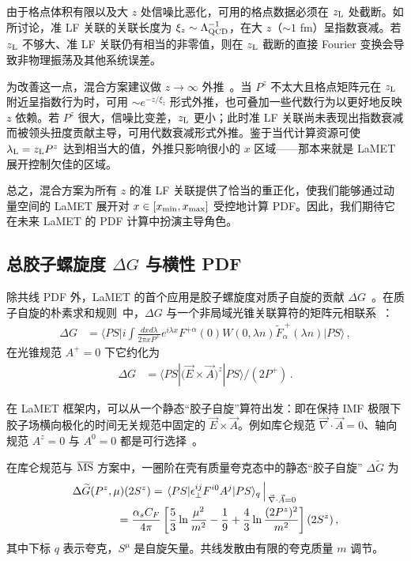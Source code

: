 由于格点体积有限以及大 $z$ 处信噪比恶化，可用的格点数据必须在 $z_{\rm L}$ 处截断。如  所讨论，准 LF 关联的关联长度为 $\xi_z\sim \Lambda_{\rm QCD}^{-1}$，在大 $z$（$\sim 1$ fm）呈指数衰减。若 $z_{\rm L}$ 不够大、准 LF 关联仍有相当的非零值，则在 $z_{\rm L}$ 截断的直接 Fourier 变换会导致非物理振荡及其他系统误差。

为改善这一点，混合方案建议做 $z\to\infty$ 外推~\cite{Ji:2020brr}。当 $P^z$ 不太大且格点矩阵元在 $z_{\rm L}$ 附近呈指数行为时，可用 $\sim e^{-z/\xi_z}$ 形式外推，也可叠加一些代数行为以更好地反映 $z$ 依赖。若 $P^z$ 很大，信噪比变差，$z_{\rm L}$ 更小；此时准 LF 关联尚未表现出指数衰减而被领头扭度贡献主导，可用代数衰减形式外推。鉴于当代计算资源可使 $\lambda_{\rm L} =z_{\rm L}P^z$ 达到相当大的值，外推只影响很小的 $x$ 区域——那本来就是 LaMET 展开控制欠佳的区域。

总之，混合方案为所有 $z$ 的准 LF 关联提供了恰当的重正化，使我们能够通过动量空间的 LaMET 展开对 $x\in[x_{\rm min}, x_{\rm max}]$ 受控地计算 PDF。因此，我们期待它在未来 LaMET 的 PDF 计算中扮演主导角色。

\subsection{总胶子螺旋度 $\Delta G$ 与横性 PDF}
\label{sec:deltaG}

除共线 PDF 外，LaMET 的首个应用是胶子螺旋度对质子自旋的贡献 $\Delta G$~\cite{Ji:2013fga}。在质子自旋的朴素求和规则~\cite{Jaffe:1989jz}中，$\Delta G$ 与一个非局域光锥关联算符的矩阵元相联系~\cite{Manohar:1990jx}：
\begin{align}\label{eq:sginv}
	\Delta G &\!=\! \langle PS\big|i\!\int\! \frac{dxd\lambda}{2\pi xP^+} e^{i\lambda x} \! F^{+\alpha}(0) W(0,\!\lambda n)\tilde F_{\alpha}^{~+} (\lambda n)\big|PS\rangle\,,
\end{align}
在光锥规范 $A^+=0$ 下它约化为
\begin{align}
	\Delta G &= \langle PS| \big(\vec{E}\times \vec{A}\big)^z|PS\rangle /(2P^+)\,.
\end{align}

在 LaMET 框架内，可以从一个静态``胶子自旋''算符出发：即在保持 IMF 极限下胶子场横向极化的时间无关规范中固定的 $\vec{E}\times \vec{A}$。例如库仑规范 $\vec{\nabla}\cdot \vec{A}=0$、轴向规范 $A^z=0$ 与 $A^0=0$ 都是可行选择~\cite{Hatta:2013gta}。

在库仑规范与 ${\overline{\rm MS}}$ 方案中，一圈阶在壳有质量夸克态中的静态``胶子自旋'' $\Delta \widetilde G$ 为~\cite{Chen:2011gn,Ji:2013fga}
\begin{align}  \label{eq:coulomb}
	&\Delta \widetilde G(P^z, \mu)  (2S^z)=\left.\langle PS| \epsilon^{ij}_\perp F^{i0}A^j|PS\rangle_q \right\arrowvert_{\vec{\nabla}\cdot \vec{A}=0}\\
	&\qquad\qquad = \frac{\alpha_sC_F}{4\pi} \left[ {5\over 3}\ln{\mu^2\over m^2} -\frac{1}{9} + \frac{4}{3}\ln \frac{(2P^z)^2}{m^2}\right](2S^z) \,,\nonumber
\end{align}
其中下标 $q$ 表示夸克，$S^\mu$ 是自旋矢量。共线发散由有限的夸克质量 $m$ 调节。

